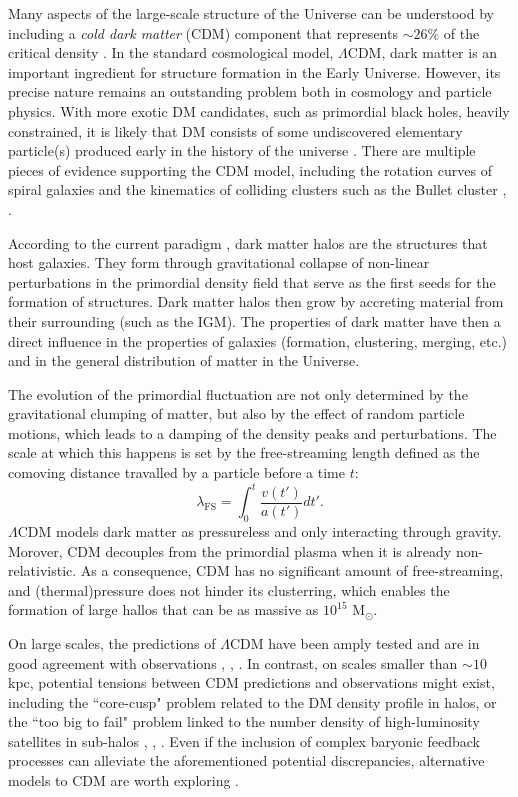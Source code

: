 Many aspects of the large-scale structure of the Universe can be understood by including a \emph{cold dark matter} (CDM) component that represents $\sim 26 \%$ of the critical density \cite{planck2014}. In the standard cosmological model, $\Lambda$CDM, dark matter is an important ingredient for structure formation in the Early Universe. However, its precise nature remains an outstanding problem both in cosmology and particle physics. With more exotic DM candidates, such as primordial black holes, heavily constrained, it is likely that DM consists of some undiscovered elementary particle(s) produced early in the history of the universe \cite{Villanueva_Domingo_2021}. There are multiple pieces of evidence supporting the CDM model, including the rotation curves of spiral galaxies and the kinematics of colliding clusters such as the Bullet cluster \cite{Navarro1996}, \cite{de_Blok_2008}.

According to the current paradigm \cite{Mo2010}, dark matter halos are the structures that host galaxies. They form through gravitational collapse of non-linear perturbations in the primordial density field that serve as the first seeds for the formation of structures. Dark matter halos then grow by accreting material from their surrounding (such as the IGM). The properties of dark matter have then a direct influence in the properties of galaxies (formation, clustering, merging, etc.) and in the general distribution of matter in the Universe.

The evolution of the primordial fluctuation are not only determined by the gravitational clumping of matter, but also by
the effect of random particle motions, which leads to a damping of the density peaks and perturbations. The scale at which this happens is set by the free-streaming length defined as the comoving distance travalled by a particle before a time $t$:
\begin{equation}
    \lambda_\mathrm{FS}=\int_0^t\frac{v(t')}{a(t')}dt'.
\end{equation}
$\Lambda$CDM models dark matter as pressureless and only interacting through gravity. Morover, CDM decouples from the primordial plasma when it is already non-relativistic.
As a consequence, CDM has no significant amount of free-streaming, and (thermal)pressure does not hinder its  clusterring, which enables the formation of large hallos that can be as massive as $10^15$ M$_\odot$.

On large scales, the predictions of $\Lambda$CDM have been amply tested and are in good agreement with observations \cite{Dalal2002}, \cite{VanWaerbeke2004}, \cite{Eisenstein2005}. In contrast, on scales smaller than $\sim 10$ kpc, potential tensions between CDM predictions and observations might exist, including the ``core-cusp" problem related to the DM density profile in halos, or the ``too big to fail" problem linked to the number density of high-luminosity satellites in sub-halos \cite{Moore1994}, \cite{Boylan_Kolchin_2011}, \cite{Weinberg_2015}. Even if the inclusion of complex baryonic feedback processes can alleviate the aforementioned potential discrepancies, alternative models to CDM are worth exploring \cite{Vogelsberger2014}.  

